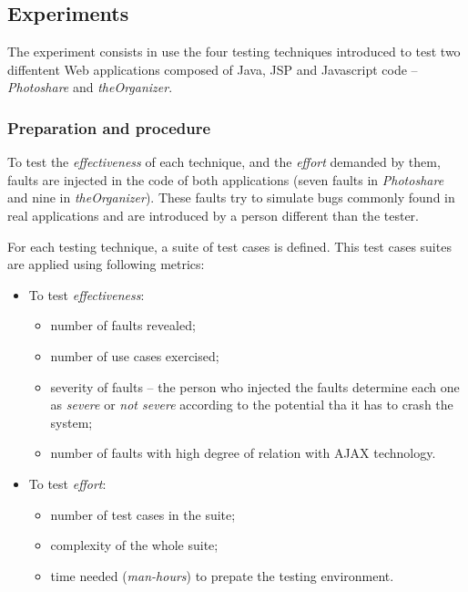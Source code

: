 \documentclass[a4paper]{article}
\begin{document}
\subsection{Experiments}

The experiment consists in use the four testing techniques introduced to test two diffentent Web applications composed of Java, JSP and Javascript code -- \emph{Photoshare} and \emph{theOrganizer}.

\subsubsection{Preparation and procedure}

To test the \emph{effectiveness} of each technique, and the \emph{effort} demanded by them, faults are injected in the code of both applications (seven faults in \emph{Photoshare} and nine in \emph{theOrganizer}).
These faults try to simulate bugs commonly found in real applications and are introduced by a person different than the tester.

For each testing technique, a suite of test cases is defined.
This test cases suites are applied using following metrics:

\begin{itemize}

\item To test \emph{effectiveness}:
\begin{itemize}
\item number of faults revealed;
\item number of use cases exercised;
\item severity of faults -- the person who injected the faults determine each one as \emph{severe} or \emph{not severe} according to the potential tha it has to crash the system;
\item number of faults with high degree of relation with AJAX technology.
\end{itemize}

\item To test \emph{effort}:
\begin{itemize}
\item number of test cases in the suite;
\item complexity of the whole suite;
\item time needed (\emph{man-hours}) to prepate the testing environment.
\end{itemize}

\end{itemize} 
\end{document}
